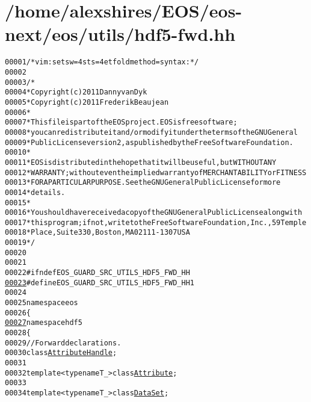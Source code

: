 \hypertarget{hdf5-fwd_8hh_source}{
\section{/home/alexshires/EOS/eos-\/next/eos/utils/hdf5-\/fwd.hh}
}


\begin{footnotesize}\begin{alltt}
00001 \textcolor{comment}{/* vim: set sw=4 sts=4 et foldmethod=syntax : */}
00002 
00003 \textcolor{comment}{/*}
00004 \textcolor{comment}{ * Copyright (c) 2011 Danny van Dyk}
00005 \textcolor{comment}{ * Copyright (c) 2011 Frederik Beaujean}
00006 \textcolor{comment}{ *}
00007 \textcolor{comment}{ * This file is part of the EOS project. EOS is free software;}
00008 \textcolor{comment}{ * you can redistribute it and/or modify it under the terms of the GNU General}
00009 \textcolor{comment}{ * Public License version 2, as published by the Free Software Foundation.}
00010 \textcolor{comment}{ *}
00011 \textcolor{comment}{ * EOS is distributed in the hope that it will be useful, but WITHOUT ANY}
00012 \textcolor{comment}{ * WARRANTY; without even the implied warranty of MERCHANTABILITY or FITNESS}
00013 \textcolor{comment}{ * FOR A PARTICULAR PURPOSE.  See the GNU General Public License for more}
00014 \textcolor{comment}{ * details.}
00015 \textcolor{comment}{ *}
00016 \textcolor{comment}{ * You should have received a copy of the GNU General Public License along with}
00017 \textcolor{comment}{ * this program; if not, write to the Free Software Foundation, Inc., 59 Temple}
00018 \textcolor{comment}{ * Place, Suite 330, Boston, MA  02111-1307  USA}
00019 \textcolor{comment}{ */}
00020 
00021 
00022 \textcolor{preprocessor}{#ifndef EOS\_GUARD\_SRC\_UTILS\_HDF5\_FWD\_HH}
\hypertarget{hdf5-fwd_8hh_source_l00023}{}\hyperlink{hdf5-fwd_8hh_ae87fcd0aa23afe6d8abfcf6373091c4d}{00023} \textcolor{preprocessor}{}\textcolor{preprocessor}{#define EOS\_GUARD\_SRC\_UTILS\_HDF5\_FWD\_HH 1}
00024 \textcolor{preprocessor}{}
00025 \textcolor{keyword}{namespace }eos
00026 \{
\hypertarget{hdf5-fwd_8hh_source_l00027}{}\hyperlink{namespaceeos_1_1hdf5}{00027}     \textcolor{keyword}{namespace }hdf5
00028     \{
00029         \textcolor{comment}{// Forward declarations.}
00030         \textcolor{keyword}{class }\hyperlink{classeos_1_1hdf5_1_1AttributeHandle}{AttributeHandle};
00031 
00032         \textcolor{keyword}{template} <\textcolor{keyword}{typename} T\_> \textcolor{keyword}{class }\hyperlink{classeos_1_1hdf5_1_1Attribute}{Attribute};
00033 
00034         \textcolor{keyword}{template} <\textcolor{keyword}{typename} T\_> \textcolor{keyword}{class }\hyperlink{classeos_1_1hdf5_1_1DataSet}{DataSet};

\end{alltt}
\end{footnotesize}

